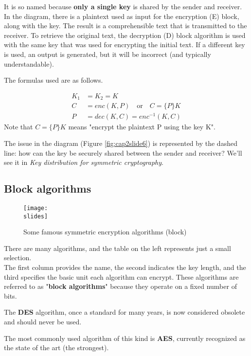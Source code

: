 It is so named because \textbf{only a single key} is shared by the sender and receiver. In the diagram, there is a plaintext used as input for the encryption (E) block, along with the key. The result is a comprehensible text that is transmitted to the receiver. To retrieve the original text, the decryption (D) block algorithm is used with the same key that was used for encrypting the initial text. If a different key is used, an output is generated, but it will be incorrect (and typically understandable).

The formulas used are as follows.

\begin{align*}
    K_1 & = K_2 = K                                    \\
    C   & = enc(K,P) \quad \text{or} \quad C = \{P\} K \\
    P   & = dec(K,C) = enc^{-1} (K,C)
\end{align*}
Note that $C = \{P\} K$ means "encrypt the plaintext P using the key K".


The issue in the diagram (Figure \ref{fig:cap2slide6}) is represented by the dashed line: how can the key be securely shared between the sender and receiver?
We'll see it in \textit{Key distribution for symmetric cryptography}.


\subsection{Block algorithms}
\begin{figure}[h]
    \centering
    \texttt{[image: \\slides]}
    \caption*{Some famous symmetric encryption algorithms (block)}
\end{figure}

There are many algorithms, and the table on the left represents just a small selection. \\
The first column provides the name, the second indicates the key length, and the third specifies the basic unit each algorithm can encrypt. These algorithms are referred to as "\textbf{block algorithms}" because they operate on a fixed number of bits.

The \textbf{DES} algorithm, once a standard for many years, is now considered obsolete and should never be used.

The most commonly used algorithm of this kind is \textbf{AES}, currently recognized as the state of the art (the strongest).

